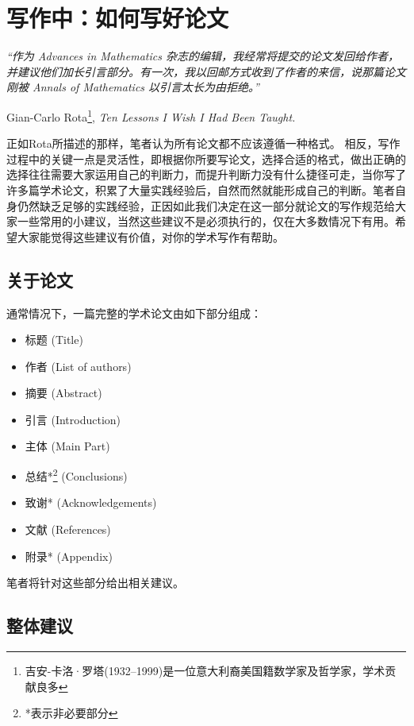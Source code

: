 \documentclass{formatBook}
\begin{document}
\section{写作中：如何写好论文}
\noindent \textit{“作为 Advances in Mathematics 杂志的编辑，我经常将提交的论文发回给作者，并建议他们加长引言部分。有一次，我以回邮方式收到了作者的来信，说那篇论文刚被 Annals of Mathematics 以引言太长为由拒绝。”}
\begin{flushright}
\cndash Gian-Carlo Rota\footnote{吉安-卡洛·罗塔(1932–1999)是一位意大利裔美国籍数学家及哲学家，学术贡献良多}, \textit{Ten Lessons I Wish I Had Been Taught.}
\end{flushright}
正如Rota所描述的那样，笔者认为所有论文都不应该遵循一种格式。 相反，写作过程中的关键一点是灵活性，即根据你所要写论文，选择合适的格式，做出正确的选择往往需要大家运用自己的判断力，而提升判断力没有什么捷径可走，当你写了许多篇学术论文，积累了大量实践经验后，自然而然就能形成自己的判断。笔者自身仍然缺乏足够的实践经验，正因如此我们决定在这一部分就论文的写作规范给大家一些常用的小建议，当然这些建议不是必须执行的，仅在大多数情况下有用。希望大家能觉得这些建议有价值，对你的学术写作有帮助。
\subsection{关于论文}
通常情况下，一篇完整的学术论文由如下部分组成：
\begin{itemize}
    \item 标题 (Title)
    \item 作者 (List of authors)
    \item 摘要 (Abstract)
    \item 引言 (Introduction)            
    \item 主体 (Main Part)
    \item 总结*\footnote{*表示非必要部分} (Conclusions)
    \item 致谢* (Acknowledgements)
    \item 文献 (References)
    \item 附录* (Appendix)
\end{itemize}
\par
笔者将针对这些部分给出相关建议。
\subsection{整体建议}
\end{document}
